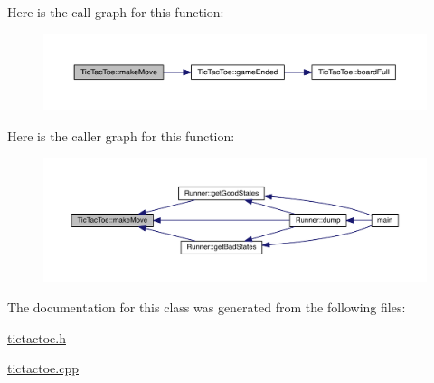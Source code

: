 Here is the call graph for this function\+:\nopagebreak
\begin{figure}[H]
\begin{center}
\leavevmode
\includegraphics[width=350pt]{class_tic_tac_toe_a597a1911309c9350aa6ce48b817a0e9e_cgraph}
\end{center}
\end{figure}
Here is the caller graph for this function\+:\nopagebreak
\begin{figure}[H]
\begin{center}
\leavevmode
\includegraphics[width=350pt]{class_tic_tac_toe_a597a1911309c9350aa6ce48b817a0e9e_icgraph}
\end{center}
\end{figure}


The documentation for this class was generated from the following files\+:\begin{DoxyCompactItemize}
\item 
\hyperlink{tictactoe_8h}{tictactoe.\+h}\item 
\hyperlink{tictactoe_8cpp}{tictactoe.\+cpp}\end{DoxyCompactItemize}
